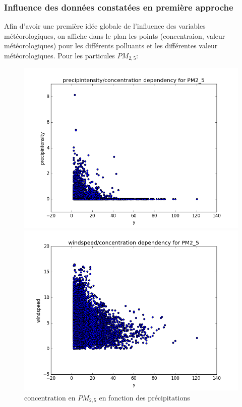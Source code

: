 \subsubsection{Influence des données constatées en première approche}
Afin d'avoir une première idée globale de l'influence des variables météorologiques, on affiche dans le plan les points (concentraion, valeur météorologiques) pour les différents polluants et les différentes valeur météorologiques.
Pour les particules $PM_{2,5}$:
\begin{figure}[H]
	\captionsetup{labelformat=empty}
	\includegraphics[width=\linewidth]{images/PM2_5_precip_y.png}
  \caption{concentration en $PM_{2,5}$ en fonction des précipitations}
	\endminipage\hfill
	\includegraphics[width=\linewidth]{images/PM2_5_windspeed_y.png}

\end{figure}
